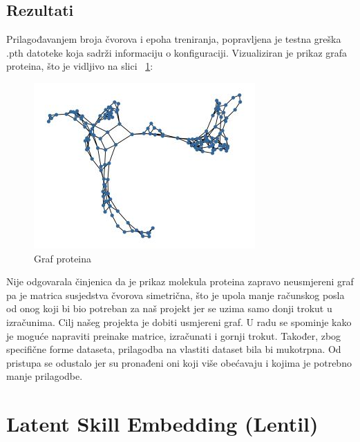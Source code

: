 \documentclass[times, utf8,projekt]{fer}
\begin{document}
\subsection{Rezultati}
Prilagođavanjem broja čvorova i epoha treniranja, popravljena je testna greška .pth datoteke koja sadrži informaciju o konfiguraciji. Vizualiziran je prikaz grafa proteina, što je vidljivo na slici ~\ref{fig:protein}:

\begin{figure}[!htb]
\centering
\includegraphics[scale=4]{protein.jpg}
\caption{Graf proteina}
\label{fig:protein}
\end{figure}
Nije odgovarala činjenica da je prikaz molekula proteina zapravo neusmjereni graf pa je matrica susjedstva čvorova simetrična, što je upola manje računskog posla od onog koji bi bio potreban za naš projekt jer se uzima samo donji trokut u izračunima. Cilj našeg projekta je dobiti usmjereni graf. U radu se spominje kako je moguće napraviti preinake matrice, izračunati i gornji trokut. Također, zbog specifične forme dataseta, prilagodba na vlastiti dataset bila bi mukotrpna. Od pristupa se odustalo jer su pronađeni oni koji više obećavaju i kojima je potrebno manje prilagodbe. 

\section{Latent Skill Embedding (Lentil)}
\end{document}
